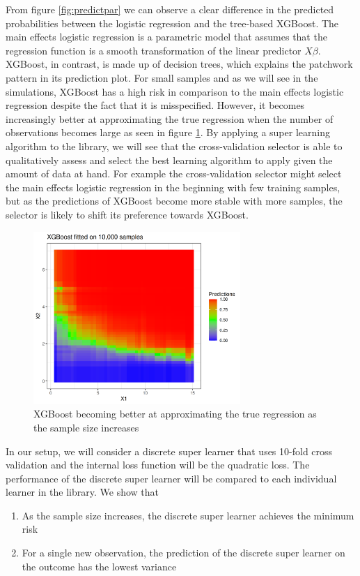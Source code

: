 \documentclass[11pt, a4paper]{article}
\theoremstyle{definition}
\theoremstyle{remark}
\begin{document}
From figure \ref{fig:predictpar} we can observe a clear difference in the predicted probabilities between the logistic regression and the tree-based XGBoost. The main effects logistic regression is a parametric model that assumes that the regression function is a smooth transformation of the linear predictor $ X\beta $. XGBoost, in contrast, is made up of decision trees, which explains the patchwork pattern in its prediction plot. For small samples and as we will see in the simulations, XGBoost has a high risk in comparison to the main effects logistic regression despite the fact that it is misspecified. However, it becomes increasingly better at approximating the true regression when the number of observations becomes large as seen in figure \ref{fig:xgboost10k}. By applying a super learning algorithm to the library, we will see that the cross-validation selector is able to qualitatively assess and select the best learning algorithm to apply given the amount of data at hand. For example the cross-validation selector might select the main effects logistic regression in the beginning with few training samples, but as the predictions of XGBoost become more stable with more samples, the selector is likely to shift its preference towards XGBoost.  
\begin{figure}[H]
    \centering
    \includegraphics[width=0.7\textwidth]{figures/xgboost10k.png}
    \caption{XGBoost becoming better at approximating the true regression as the sample size increases}
    \label{fig:xgboost10k}
\end{figure}
In our setup, we will consider a discrete super learner that uses 10-fold cross validation and the internal loss function will be the quadratic loss. The performance of the discrete super learner will be compared to each individual learner in the library. We show that
\begin{enumerate}
    \item As the sample size increases, the  discrete super learner achieves the minimum risk 
    \item For a single new observation, the prediction of the discrete super learner on the outcome has the lowest variance
\end{enumerate}
\end{document}

